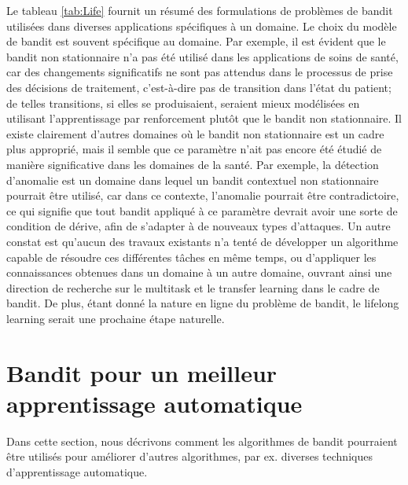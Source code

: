 \documentclass[conference]{IEEEtran}
\newcommand{\1}[1]{\mathbbm{1}_{\left\{#1\right\}}}
\begin{document}
Le tableau \ref{tab:Life} fournit un résumé des formulations de problèmes de bandit utilisées dans diverses applications spécifiques à un domaine. Le choix du modèle de bandit est souvent spécifique au domaine. Par exemple, il est évident que le bandit non stationnaire n'a pas été utilisé dans les applications de soins de santé, car des changements significatifs ne sont pas attendus dans le processus de prise des décisions de traitement, c'est-à-dire pas de transition dans l'état du patient; de telles transitions, si elles se produisaient, seraient mieux modélisées en utilisant l'apprentissage par renforcement plutôt que le bandit non stationnaire. Il existe clairement d'autres domaines où le bandit non stationnaire est un cadre plus approprié, mais il semble que ce paramètre n'ait pas encore été étudié de manière significative dans les domaines de la santé. Par exemple, la détection d'anomalie est un domaine dans lequel un bandit contextuel non stationnaire pourrait être utilisé, car dans ce contexte, l'anomalie pourrait être contradictoire, ce qui signifie que tout bandit appliqué à ce paramètre devrait avoir une sorte de condition de dérive, afin de s'adapter à de nouveaux types d'attaques. Un autre constat est qu'aucun des travaux existants n'a tenté de développer un algorithme capable de résoudre ces différentes tâches en même temps, ou d'appliquer les connaissances obtenues dans un domaine à un autre domaine, ouvrant ainsi une direction de recherche sur le multitask et le transfer learning dans le cadre de bandit. De plus, étant donné la nature en ligne du problème de bandit, le lifelong learning serait une prochaine étape naturelle.

  


\section{Bandit pour un meilleur apprentissage automatique}
Dans cette section, nous décrivons comment les algorithmes de bandit pourraient être utilisés pour améliorer d'autres algorithmes, par ex. diverses techniques d'apprentissage automatique.
\end{document}
